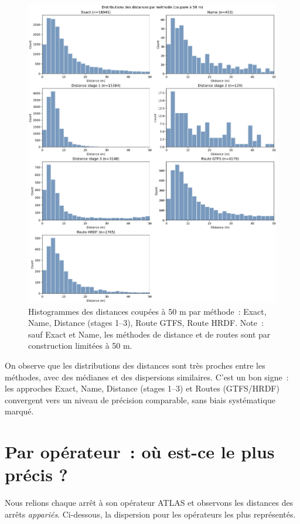 \begin{figure}[H]
    \centering
    \includegraphics[width=\textwidth]{../figures/chap5/distance_distributions_methods_0_50.png}
    \caption[Histogrammes par méthode (0–50 m)]{Histogrammes des distances coupées à 50 m par méthode : Exact, Name, Distance (stages 1–3), Route GTFS, Route HRDF. Note : sauf Exact et Name, les méthodes de distance et de routes sont par construction limitées à 50 m.}
\end{figure}

On observe que les distributions des distances sont très proches entre les méthodes, avec des médianes et des dispersions similaires. C’est un bon signe : les approches Exact, Name, Distance (stages 1–3) et Routes (GTFS/HRDF) convergent vers un niveau de précision comparable, sans biais systématique marqué.


\section{Par opérateur : où est-ce le plus précis ?}

Nous relions chaque arrêt à son opérateur ATLAS et observons les distances des arrêts \textit{appariés}. Ci-dessous, la dispersion pour les opérateurs les plus représentés.

